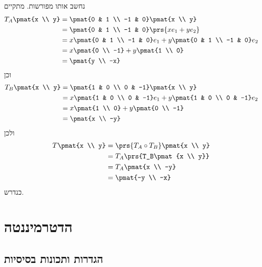 \documentclass[a4paper,10pt,twoside,openany]{book}
\begin{document}
\begin{solution}
נחשב אותו מפורשות. מתקיים
\begin{align*}
T_A \pmat{x \\ y} &= \pmat{0 & 1 \\ -1 & 0} \pmat{x \\ y}
\\&=
\pmat{0 & 1 \\ -1 & 0} \prs{x e_1 + y e_2}
\\&=
x \pmat{0 & 1 \\ -1 & 0} e_1 + y \pmat{0 & 1 \\ -1 & 0} e_2
\\&=
x \pmat{0 \\ -1} + y \pmat{1 \\ 0}
\\&= 
\pmat{y \\ -x}
\end{align*}
וכן
\begin{align*}
T_B\pmat{x \\ y} &= \pmat{1 & 0 \\ 0 & -1} \pmat{x \\ y}
\\&=
x \pmat{1 & 0 \\ 0 & -1} e_1 + y \pmat{1 & 0 \\ 0 & -1} e_2
\\&=
x \pmat{1 \\ 0} + y \pmat{0 \\ -1}
\\&=
\pmat{x \\ -y}
\end{align*}
ולכן
\begin{align*}
T\pmat{x \\ y} &= \prs{T_A \circ T_B} \pmat{x \\ y}
\\&=
T_A\prs{T_B\pmat{x \\ y}}
\\&=
T_A\pmat{x \\ -y}
\\&=
\pmat{-y \\ -x}
\end{align*}
כנדרש.
\end{solution}

\chapter{הדטרמיננטה}

\section{הגדרות ותכונות בסיסיות}
\end{document}
